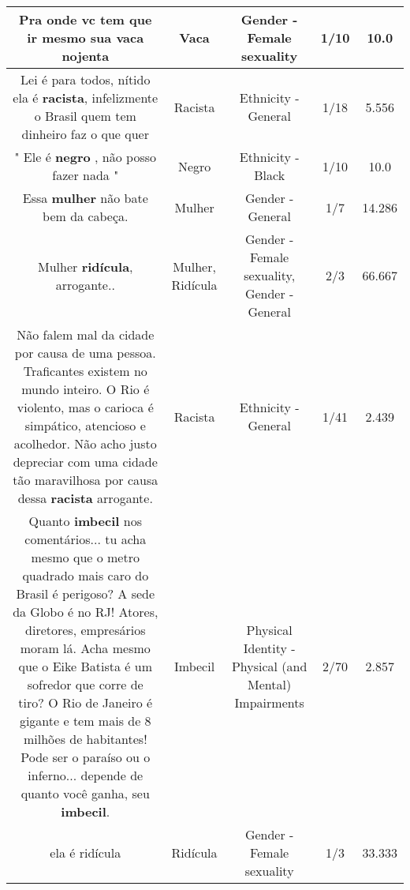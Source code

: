 \documentclass[11pt]{article}
\newlength\mylength
\begin{document}
\begin{center}
\begin{longtable}{|C{.65\mylength}|C{.30\mylength}|C{.12\mylength}|C{.12\mylength}|C{.12\mylength}|}
  \small Pra onde vc tem que ir mesmo sua \textbf{vaca} nojenta\normalsize   & Vaca & Gender - Female sexuality & 1/10 & 10.0 \\  \hline
  \small Lei é para todos, nítido ela é \textbf{racista}, infelizmente o Brasil quem tem dinheiro faz o que quer\normalsize   & Racista & Ethnicity - General & 1/18 & 5.556 \\  \hline
  \small " Ele é \textbf{negro} , não posso fazer nada "\normalsize   & Negro & Ethnicity - Black & 1/10 & 10.0 \\  \hline
  \small Essa \textbf{mulher} não bate bem da cabeça.\normalsize   & Mulher & Gender - General & 1/7 & 14.286 \\  \hline
  \small Mulher \textbf{ridícula}, arrogante..\normalsize   & Mulher, Ridícula & Gender - Female sexuality, Gender - General & 2/3 & 66.667 \\  \hline
  \small Não falem mal da cidade por causa de uma pessoa. Traficantes existem no mundo inteiro. O Rio é violento, mas o carioca é simpático, atencioso  e acolhedor.  Não acho justo depreciar com uma cidade tão maravilhosa por causa dessa \textbf{racista} arrogante.\normalsize   & Racista & Ethnicity - General & 1/41 & 2.439 \\  \hline
  \small Quanto \textbf{imbecil} nos comentários... tu acha mesmo que o metro quadrado mais caro do Brasil é perigoso? A sede da Globo é no RJ! Atores, diretores, empresários moram lá. Acha mesmo que o Eike Batista é um sofredor que corre de tiro? O Rio de Janeiro é gigante e tem mais de 8 milhões de habitantes! Pode ser o paraíso ou o inferno... depende de quanto você ganha, seu \textbf{imbecil}.\normalsize   & Imbecil & Physical Identity - Physical (and Mental) Impairments & 2/70 & 2.857 \\  \hline
  \small ela é ridícula\normalsize   & Ridícula & Gender - Female sexuality & 1/3 & 33.333 \\  \hline

\end{longtable}
\end{center}
\end{document}
